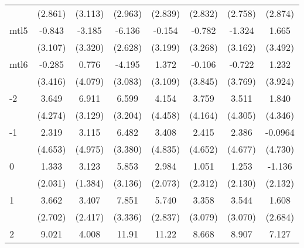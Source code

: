 \documentclass{article}
\begin{document}
{\begin{longtable}{l*{7}{c}}
                &  (2.861)         &  (3.113)         &  (2.963)         &  (2.839)         &  (2.832)         &  (2.758)         &  (2.874)         \\
mtl5            &   -0.843         &   -3.185         &   -6.136\sym{*}  &   -0.154         &   -0.782         &   -1.324         &    1.665         \\
                &  (3.107)         &  (3.320)         &  (2.628)         &  (3.199)         &  (3.268)         &  (3.162)         &  (3.492)         \\
mtl6            &   -0.285         &    0.776         &   -4.195         &    1.372         &   -0.106         &   -0.722         &    1.232         \\
                &  (3.416)         &  (4.079)         &  (3.083)         &  (3.109)         &  (3.845)         &  (3.769)         &  (3.924)         \\
-2              &    3.649         &    6.911\sym{*}  &    6.599         &    4.154         &    3.759         &    3.511         &    1.840         \\
                &  (4.274)         &  (3.129)         &  (3.204)         &  (4.458)         &  (4.164)         &  (4.305)         &  (4.346)         \\
-1              &    2.319         &    3.115         &    6.482         &    3.408         &    2.415         &    2.386         &  -0.0964         \\
                &  (4.653)         &  (4.975)         &  (3.380)         &  (4.835)         &  (4.652)         &  (4.677)         &  (4.730)         \\
0               &    1.333         &    3.123\sym{*}  &    5.853         &    2.984         &    1.051         &    1.253         &   -1.136         \\
                &  (2.031)         &  (1.384)         &  (3.136)         &  (2.073)         &  (2.312)         &  (2.130)         &  (2.132)         \\
1               &    3.662         &    3.407         &    7.851\sym{*}  &    5.740         &    3.358         &    3.544         &    1.608         \\
                &  (2.702)         &  (2.417)         &  (3.336)         &  (2.837)         &  (3.079)         &  (3.070)         &  (2.684)         \\
2               &    9.021\sym{*}  &    4.008         &    11.91\sym{**} &    11.22\sym{**} &    8.668\sym{*}  &    8.907\sym{*}  &    7.127\sym{*}  \\

\end{longtable}}
\end{document}
